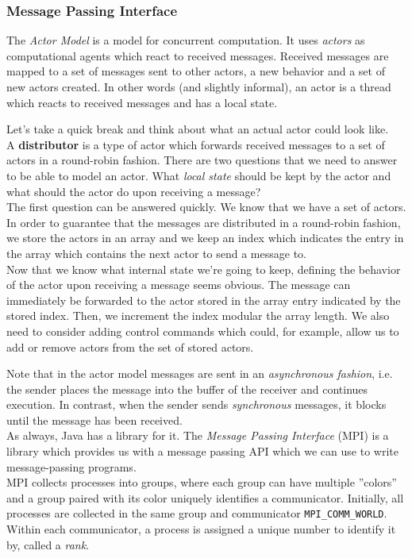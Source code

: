 \documentclass[main]{subfiles}
\begin{document}
\subsubsection{Message Passing Interface}
The \textit{Actor Model} is a model for concurrent computation. It uses \textit{actors} as computational agents which react to received messages. Received messages are mapped to a set of messages sent to other actors, a new behavior and a set of new actors created. In other words (and slightly informal), an actor is a thread which reacts to received messages and has a local state.
\begin{example}
    Let's take a quick break and think about what an actual actor could look like.\\[3mm]
    A \textbf{distributor} is a type of actor which forwards received messages to a set of actors in a round-robin fashion. There are two questions that we need to answer to be able to model an actor. What \textit{local state} should be kept by the actor and what should the actor do upon receiving a message? \\[3mm]
    The first question can be answered quickly. We know that we have a set of actors. In order to guarantee that the messages are distributed in a round-robin fashion, we store the actors in an array and we keep an index which indicates the entry in the array which contains the next actor to send a message to.\\[3mm]
    Now that we know what internal state we're going to keep, defining the behavior of the actor upon receiving a message seems obvious. The message can immediately be forwarded to the actor stored in the array entry indicated by the stored index. Then, we increment the index modular the array length. We also need to consider adding control commands which could, for example, allow us to add or remove actors from the set of stored actors.
\end{example}
Note that in the actor model messages are sent in an \textit{asynchronous fashion}, i.e. the sender places the message into the buffer of the receiver and continues execution. In contrast, when the sender sends \textit{synchronous} messages, it blocks until the message has been received.\\[3mm]
As always, Java has a library for it. The \textit{Message Passing Interface} (MPI) is a library which provides us with a message passing API which we can use to write message-passing programs.\\[3mm]
MPI collects processes into groups, where each group can have multiple ''colors'' and a group paired with its color uniquely identifies a communicator. Initially, all processes are collected in the same group and communicator \texttt{MPI\_COMM\_WORLD}. Within each communicator, a process is assigned a unique number to identify it by, called a \textit{rank}.
\end{document}
